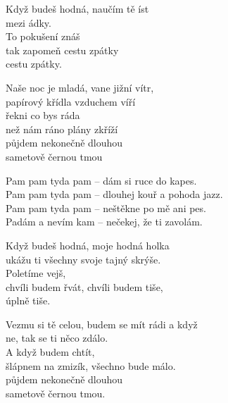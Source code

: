 
\ve{}
Když budeš hodná, naučím tě íst\\
mezi ádky.\\
To pokušení znáš\\
tak zapomeň cestu zpátky\\
cestu zpátky.

\ve{}
Naše noc je mladá, vane jižní vítr,\\
papírový křídla vzduchem víří\\
řekni co bys ráda\\
než nám ráno plány zkříží\\
půjdem nekonečně dlouhou\\
sametově černou tmou 

\cho{}
Pam pam tyda pam -- dám si ruce do kapes.\\
Pam pam tyda pam -- dlouhej kouř a pohoda jazz.\\
Pam pam tyda pam -- neštěkne po mě ani pes.\\
Padám a nevím kam -- nečekej, že ti zavolám.

\ve{}
Když budeš hodná, moje hodná holka\\
ukážu ti všechny svoje tajný skrýše.\\
Poletíme vejš,\\
chvíli budem řvát, chvíli budem tiše,\\
úplně tiše.

\ve{}
Vezmu si tě celou, budem se mít rádi a když\\
ne, tak se ti něco zdálo.\\
A když budem chtít,\\
šlápnem na zmizík, všechno bude málo.\\
půjdem nekonečně dlouhou\\
sametově černou tmou.

\cho{}

\esong